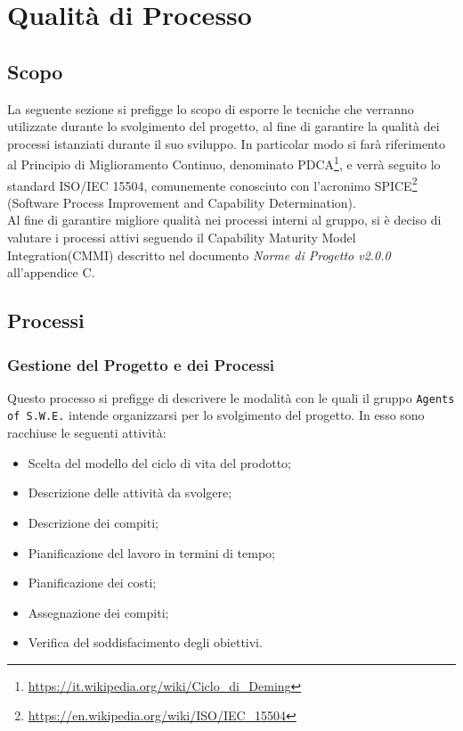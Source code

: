 \section{Qualità di Processo}
\label{qualitaProcesso}

\subsection{Scopo}

La seguente sezione si prefigge lo scopo di esporre le tecniche che verranno utilizzate durante lo svolgimento del progetto, al fine di garantire la qualità dei processi istanziati durante il suo sviluppo. In particolar modo si farà riferimento al Principio di Miglioramento Continuo, denominato PDCA\glossario\footnote{\url{https://it.wikipedia.org/wiki/Ciclo_di_Deming}}, e verrà seguito lo standard ISO/IEC 15504, comunemente conosciuto con l'acronimo SPICE\glossario\footnote{\url{https://en.wikipedia.org/wiki/ISO/IEC_15504}} (Software Process Improvement and Capability Determination).\\
Al fine di garantire migliore qualità nei processi interni al gruppo, si è deciso di valutare i processi attivi seguendo il Capability Maturity Model Integration(CMMI) descritto nel documento \textit{Norme di Progetto v2.0.0} all'appendice C.

\subsection{Processi}
\subsubsection{Gestione del Progetto e dei Processi} 

Questo processo si prefigge di descrivere le modalità con le quali il gruppo \texttt{Agents of S.W.E.} intende organizzarsi per lo svolgimento del progetto. In esso sono racchiuse le seguenti attività:
\begin{itemize}
	\item Scelta del modello del ciclo di vita del prodotto;
	\item Descrizione delle attività da svolgere;
	\item Descrizione dei compiti;
	\item Pianificazione del lavoro in termini di tempo;
	\item Pianificazione dei costi;
	\item Assegnazione dei compiti;
	\item Verifica del soddisfacimento degli obiettivi.
\end{itemize}

